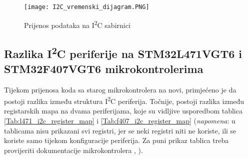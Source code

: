 \begin{figure}[hp]
	\centering
	\texttt{[image: I2C\_vremenski\_dijagram.PNG]}
	\caption{Prijenos podataka na I\textsuperscript{2}C sabirnici \cite{i2c_manual}}
	\label{fig:i2c_timing_diagram_transaction}
\end{figure}

\subsection{Razlika I\textsuperscript{2}C periferije na STM32L471VGT6 i \newline STM32F407VGT6 mikrokontrolerima}

Tijekom prijenosa koda sa starog mikrokontrolera na novi, primjećeno je da postoji razlika između struktura I\textsuperscript{2}C periferija. Točnije, postoji razlika između registarskih mapa na dvama periferijama, koje su vidljive usporedbom tablica \ref{Tab:l471_i2c_register_map} i \ref{Tab:f407_i2c_register_map} (\textit{napomena}: u tablicama nisu prikazani svi registri, jer se neki registri niti ne koriste, ili se koriste samo tijekom konfiguracije periferija. Za puni prikaz tablica treba provijeriti dokumentacije mikrokontrolera \cite{f407_manual}, \citep{l471_manual}).

